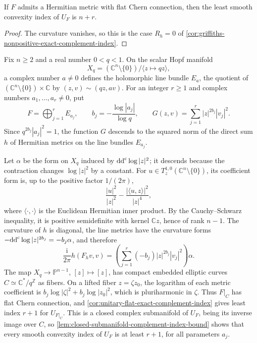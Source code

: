 \begin{corollary}\label{cor:unitary-flat-exact-complement-index}\label{lem:unitary-flat-complement-obstruction}
If $F$ admits a Hermitian metric with flat Chern connection, then the least smooth convexity index of $U_F$ is $n+r$.
\end{corollary}
\begin{proof}
The curvature vanishes, so this is the case $R_h=0$ of \cref{cor:griffiths-nonpositive-exact-complement-index}.
\end{proof}

Fix $n\geq2$ and a real number $0<q<1$. On the scalar Hopf manifold
\[
 X_q=(\mathbb C^n\setminus\{0\})/\langle z\mapsto qz\rangle,
\]
a complex number $a\ne0$ defines the holomorphic line bundle $E_a$, the quotient of $(\mathbb C^n\setminus\{0\})\times\mathbb C$ by $(z,v)\sim(qz,av)$. For an integer $r\geq1$ and complex numbers $a_1,\ldots,a_r\ne0$, put
\[
 F=\bigoplus_{j=1}^r E_{a_j},\qquad
 b_j=-\frac{\log|a_j|}{\log q},\qquad
 G(z,v)=\sum_{j=1}^r |z|^{2b_j}|v_j|^2.
\]
Since $q^{2b_j}|a_j|^2=1$, the function $G$ descends to the squared norm of the direct sum $h$ of Hermitian metrics on the line bundles $E_{a_j}$.

Let $\alpha$ be the form on $X_q$ induced by $\mathrm{dd}^{\mathrm{c}}\log|z|^2$; it descends because the contraction changes $\log|z|^2$ by a constant. For $u\in T_z^{1,0}(\mathbb C^n\setminus\{0\})$, its coefficient form is, up to the positive factor $1/(2\pi)$,
\[
 \frac{|u|^2}{|z|^2}-\frac{|\langle u,z\rangle|^2}{|z|^4},
\]
where $\langle\cdot,\cdot\rangle$ is the Euclidean Hermitian inner product. By the Cauchy--Schwarz inequality, it is positive semidefinite with kernel $\mathbb Cz$, hence of rank $n-1$. The curvature of $h$ is diagonal, the line metrics have the curvature forms $-\mathrm{dd}^{\mathrm{c}}\log|z|^{2b_j}=-b_j\alpha$, and therefore
\[
 \frac{\mathrm i}{2\pi}h(F_hv,v)
 =\left(\sum_{j=1}^r(-b_j)|z|^{2b_j}|v_j|^2\right)\alpha.
\]
The map $X_q\to\mathbb P^{n-1}$, $[z]\mapsto[z]$, has compact embedded elliptic curves $C\simeq\mathbb C^*/q^{\mathbb Z}$ as fibers. On a lifted fiber $z=\zeta z_0$, the logarithm of each metric coefficient is $b_j\log|\zeta|^2+b_j\log|z_0|^2$, which is pluriharmonic in $\zeta$. Thus $F|_C$ has flat Chern connection, and \cref{cor:unitary-flat-exact-complement-index} gives least index $r+1$ for $U_{F|_C}$. This is a closed complex submanifold of $U_F$, being its inverse image over $C$, so \cref{lem:closed-submanifold-complement-index-bound} shows that every smooth convexity index of $U_F$ is at least $r+1$, for all parameters $a_j$.

